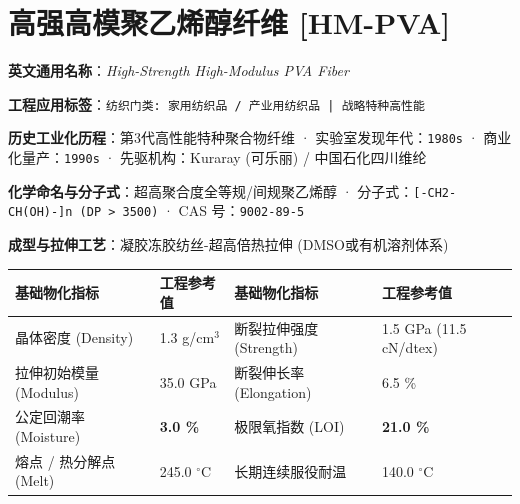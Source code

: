 \documentclass[11pt,openright,twoside,UTF8]{ctexbook}
\begin{document}
\section{高强高模聚乙烯醇纤维 [HM-PVA]}
\label{sec:hm-pva}

\noindent\textbf{英文通用名称}：\textit{High-Strength High-Modulus PVA Fiber}\par
\noindent\textbf{工程应用标签}：\texttt{纺织门类: 家用纺织品 / 产业用纺织品 | 战略特种高性能}\par
\noindent\textbf{历史工业化历程}：第3代高性能特种聚合物纤维 · 实验室发现年代：\texttt{1980s} · 商业化量产：\texttt{1990s} · 先驱机构：Kuraray (可乐丽) / 中国石化四川维纶\par
\noindent\textbf{化学命名与分子式}：超高聚合度全等规/间规聚乙烯醇 · 分子式：\texttt{[-CH2-CH(OH)-]n (DP \textgreater{} 3500)} · CAS 号：\texttt{9002-89-5}\par
\noindent\textbf{成型与拉伸工艺}：凝胶冻胶纺丝-超高倍热拉伸 (DMSO或有机溶剂体系)\par

\vspace{0.15cm}
\begin{center}
\small
\begin{tabularx}{\textwidth}{p{3.8cm}Xp{3.8cm}X}
\toprule
\textbf{基础物化指标} & \textbf{工程参考值} & \textbf{基础物化指标} & \textbf{工程参考值} \\
\midrule
晶体密度 (Density) & 1.3 g/cm$^3$ & 断裂拉伸强度 (Strength) & 1.5 GPa (11.5 cN/dtex) \\
拉伸初始模量 (Modulus) & 35.0 GPa & 断裂伸长率 (Elongation) & 6.5 \% \\
公定回潮率 (Moisture) & \textbf{3.0 \%} & 极限氧指数 (LOI) & \textbf{21.0 \%} \\
熔点 / 热分解点 (Melt) & 245.0 $^\circ\mathrm{C}$ & 长期连续服役耐温 & 140.0 $^\circ\mathrm{C}$ \\
\bottomrule
\end{tabularx}
\end{center}
\vspace{0.15cm}
\end{document}
